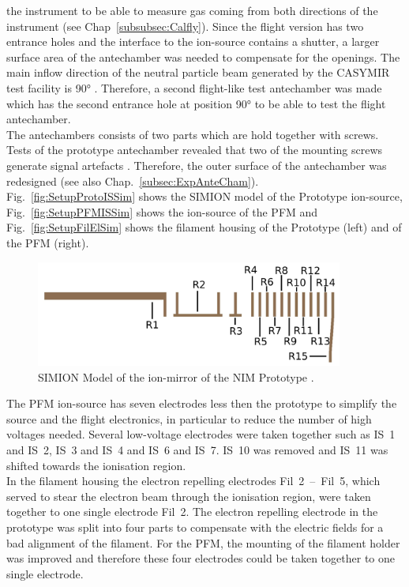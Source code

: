 	the instrument to be able to measure gas coming from both directions of the instrument (see Chap~\ref{subsubsec:Calfly}). Since the flight version has two entrance holes and the interface to the ion-source contains a shutter, a larger surface area of the antechamber was needed to compensate for the openings. %
	The main inflow direction of the neutral particle beam generated by the CASYMIR test facility is 90° \cite{CASYMIR_Graf2004}. Therefore, a second flight-like test antechamber was made which has the second entrance hole at position 90° to be able to test the flight antechamber.\\
	The antechambers consists of two parts which are hold together with screws. Tests of the prototype antechamber revealed that two of the mounting screws generate signal artefacts \cite{Meyer_2017_ante}. Therefore, the outer surface of the antechamber was redesigned (see also Chap.~\ref{subsec:ExpAnteCham}).\\
	Fig.~\ref{fig:SetupProtoISSim} shows the SIMION model of the Prototype ion-source, Fig.~\ref{fig:SetupPFMISSim} shows the ion-source of the PFM and Fig.~\ref{fig:SetupFilElSim} shows the filament housing of the Prototype (left) and of the PFM (right).
	\begin{figure}[h] %
		\centering
		\includegraphics[width=0.9\textwidth]{Setup/Prototype_Reflectron_sim.png}
		\caption{SIMION Model of the ion-mirror of the NIM Prototype \cite{Diss_Meyer}.}
		\label{fig:SetupProtoReflSim}
	\end{figure}
	The PFM ion-source has seven electrodes less then the prototype to simplify the source and the flight electronics, in particular to reduce the number of high voltages needed. Several low-voltage electrodes were taken together such as IS~1 and IS~2, IS~3 and IS~4 and IS~6 and IS~7. IS~10 was removed and IS~11 was shifted towards the ionisation region.\\
	In the filament housing the electron repelling electrodes Fil~2~--~Fil~5, which served to stear the electron beam through the ionisation region, were taken together to one single electrode Fil~2. The electron repelling electrode in the prototype was split into four parts to compensate with the electric fields for a bad alignment of the filament. For the PFM, the mounting of the filament holder was improved and therefore these four electrodes could be taken together to one single electrode.\\
